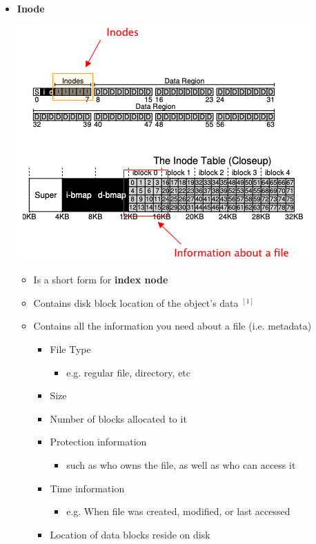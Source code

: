 \documentclass[12pt]{article}
\begin{document}
\begin{itemize}
    \item \textbf{Inode}

    \begin{center}
    \includegraphics[width=\linewidth]{images/midterm_1_solution_12.png}
    \end{center}

    \begin{itemize}
        \item Is a short form for \textbf{index node}
        \item Contains disk block location of the object's data $^{[1]}$
        \item Contains all the information you need about a file (i.e. metadata)

        \begin{itemize}
            \item File Type
            \begin{itemize}
                \item e.g. regular file, directory, etc
            \end{itemize}
            \item Size
            \item Number of blocks allocated to it
            \item Protection information
            \begin{itemize}
                \item such as who owns the file, as well as who can access it
            \end{itemize}
            \item Time information
            \begin{itemize}
                \item e.g. When file was created, modified, or last accessed
            \end{itemize}
            \item Location of data blocks reside on disk
        \end{itemize}
    \end{itemize}
\end{itemize}
\end{document}
